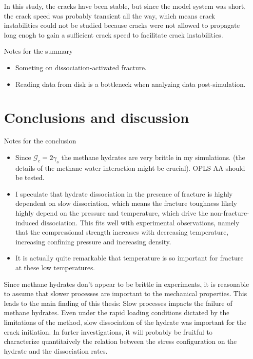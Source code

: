 In this study, the cracks have been stable, but since the model system was short, the crack speed was probably transient all the way, which means crack instabilities could not be studied because cracks were not allowed to propagate long enogh to gain a sufficient crack speed to facilitate crack instabilities.

Notes for the summary
\begin{itemize}
\item Someting on dissociation-activated fracture.
\item Reading data from disk is a bottleneck when analyzing data post-simulation. 
\end{itemize}

\section{Conclusions and discussion}
Notes for the conclusion
\begin{itemize}
\item Since $\mathcal{G}_c = 2\gamma_s$ the methane hydrates are very brittle in my simulations. (the details of the methane-water interaction might be crucial). OPLS-AA should be tested.
\item I speculate that hydrate dissociation in the presence of fracture is highly dependent on slow dissociation, which means the fracture toughness likely highly depend on the pressure and temperature, which drive the non-fracture-induced dissociation. This fits well with experimental observations, namely that the compressional strength increases with decreasing temperature, increasing confining pressure and increasing density.
\item It is actually quite remarkable that temperature is so important for fracture at these low temperatures.
\end{itemize}

Since methane hydrates don't appear to be brittle in experiments, it is reasonable to assume that slower processes are important to the mechanical properties. This leads to the main finding of this thesis: Slow processes impacts the failure of methane hydrates. Even under the rapid loading conditions dictated by the limitations of the method, slow dissociation of the hydrate was important for the crack initiation.
%
In furter investigations, it will probably be fruitful to characterize quantitaively the relation between the stress configuration on the hydrate and the dissociation rates. 

